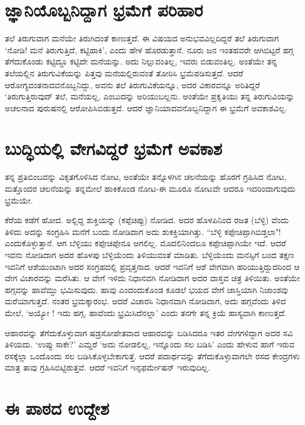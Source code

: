 \section*{ಜ್ಞಾನಿಯೊಬ್ಬನಿದ್ದಾಗ ಭ್ರಮೆಗೆ ಪರಿಹಾರ}

ತಲೆ ತಿರುಗುವಾಗ ಮನೆಯೇ ತಿರುಗಿದಂತೆ ಕಾಣುತ್ತದೆ. ಈ ವಿಷಯದ ಅನುಭವವಿಲ್ಲದಿದ್ದರೆ ತಲೆ ತಿರುಗುವಾಗ `ನೋಡಿ! ಮನೆ ತಿರುಗುತ್ತಿದೆ, ಕಟ್ಟಿಹಾಕಿ', ಎಂದು ಹೇಳ ಹೊರಡುತ್ತಾನೆ. ನೂರು ಜನ ಇಂತಹವರೇ ಆಗಿಬಿಟ್ಟರೆ ಹಗ್ಗ ತೆಗೆದುಕೊಂಡು ಕಟ್ಟಿದ್ದೂ ಕಟ್ಟಿದೇ ಮನೆಯನ್ನು. ಅದು ನಿಲ್ಲುವಂತಿಲ್ಲ, ಇವರು ಬಿಡುವಂತಿಲ್ಲ. ಅಂತೆಯೇ ತನ್ನ ತಲೆಯಲ್ಲಿನ ತಿರುಗುವಿಕೆಯನ್ನು ಪಿತ್ತವು ಮನೆಯಲ್ಲಿರುವಂತೆ ತೋರಿಸಿ ಭ್ರಮೆಪಡಿಸುತ್ತದೆ. ಆದರೆ ಆರೋಗ್ಯವಂತನಾದವನೊಬ್ಬನಿದ್ದು, ಅವನು ತಲೆ ತಿರುಗುವಿಕೆಯನ್ನೂ, ಅದರ ವಿಕಾರವನ್ನೂ ಅರಿತಿದ್ದರೆ `ತಿರುಗುತ್ತಿರುವುದ್ ತಲೆ, ಮನೆಯಲ್ಲ, ಎಂಬುದನ್ನು ಅರಿಯುಬಲ್ಲನು. ಅಂತೆಯೇ ಪ್ರಕೃತಿಯು ತನ್ನ ತಿರುಗುವಿಯನ್ನು ಅಚಲನಾದ ಪುರುಷನಲ್ಲಿ ಆರೋಪಿಸಿಬಿಡುತ್ತದೆ. ಆದರೆ ಜ್ಞಾನಿಯಾದವನೊಬ್ಬನಿದ್ದಾಗ ಈ ಭ್ರಮೆಗೆ ಅವಕಾಶವಿಲ್ಲ.

\section*{ಬುದ್ಧಿಯಲ್ಲಿ ವೇಗವಿದ್ದರೆ ಭ್ರಮೆಗೆ ಅವಕಾಶ}
ತನ್ನ ಪ್ರತಿಬಿಂಬವನ್ನು ವಿಕೃತಗೊಳಿಸಿದ ನೋಟ, ಅಂತೆಯೇ ತನ್ನೊಳಗಿನ ಚಲನೆಯನ್ನು ಹೊರಗೆ ಗ್ರಹಿಸಿದ ನೋಟ, ಮತ್ತೊಂದರ ಚಲನೆಯನ್ನು  ತನ್ನಮೇಲೆ ಹಾಕಿಕೊಂಡ ನೋಟ-ಈ ಮೂರೂ ನೋಟವೇ ಆದರೂ ಇದರಿಂದಾಗುವುದು ಭ್ರಮೆಯೇ.

ಕೆರೆಯ ಕಡೆಗೆ ಹೋದ. ಅಲ್ಲಿದ್ದ ಶುಕ್ತಿಯನ್ನು (ಕಪ್ಪೆಚಿಪ್ಪು) ನೋಡಿದ. ಅದರ ಹೊಳಪಿನಿಂದ ರಜತ (ಬೆಳ್ಳಿ) ವೆಂದು ತಿಳಿದು ಅದನ್ನು ಸಂಗ್ರಹಿಸಿ ಮನೆಗೆ ಬಂದು ನೋಡಿದಾಗ ಅದು ಶುಕಕ್ತಿಯಾಗಿತ್ತು. ``ಬೆಳ್ಳಿ ಕಪ್ಪೇಚಿಪ್ಪಾಗಿಬಿಡ್ತಲಾ"! ಎಂದುಕೊಳ್ಳುತ್ತಾನೆ. ಆಗ ಬೆಳ್ಳಿಯು ಕಪ್ಪೇಚಿಪ್ಪೇನೂ ಆಗಲಿಲ್ಲ. ಮೊದಲಿನಿಂದಲೂ ಕಪ್ಪೇಚಿಪ್ಪಾಗಿಯೇ ಇದೆ. ಆದರೆ ಇವನು ನೋಡಿದಾಗ ಅದರ ಹೊಳಪು ಬೆಳ್ಳಿಯೆಂದು ತಿಳಿಯುವಂತೆ ಮಾಡಿತು. ಬೆಳ್ಳಿಯೆಂದು ಮನಸ್ಸಿಗೆ ಬಂದ ತಕ್ಷಣ ಇವನಿಗೆ ಆಶೆಯುಂಟಾಗಿ ಅದರ ಸಂಗ್ರಹದಲ್ಲಿ ಪ್ರವೃತ್ತನಾದ. ಆದರೆ ಇವನಿಗೆ ಆಶೆ ವೇಗವಾಗಿ ಹರಿಯುತ್ತಿದ್ದುದರಿಂದ ಆ ವೇಗ ವಿಚಾರವನ್ನು ಮರೆಸಿತು. ಆ ವೇಗೆ ಇಳಿದು ನಿಧಾನವಗಿ ನೋಡಿದಾಗ ಅದರ ವಾಸ್ತವ ಚಿತ್ರ ತಿಳಿಯಿತು. ಅಂತೆಯೇ ಹಗ್ಗವನ್ನು ಹಾವೆಮ್ದು  ಭಮಿಸುವುದು. ಹಾವು ಎಂದಂದುಕೊಂಡ ಕೂಡಲೆ ಭಯದ ವೇಗೆ ಜಾಸ್ತಿಯಾಗಿ ನಿಜಾಂಶವು ಮರೆಯಾಗುತ್ತದೆ. ನಂತರ ಭ್ರಮಕ್ಕಾರಂಭ. ಆದರೆ ವಿಚಾರಸಿ ನಿಧಾನವಾಗಿ ನೋಡಿದಾಗ, ಅದು ಹಗ್ಗವೆಂದು ತಿಳಿದ ಮೇಲೆ, `ಅಯ್ಯೋ ! ಇದು ಹಗ್ಗ, ಹಾವೆಂದು ಭ್ರಮಿಸಿದೆನಲ್ಲಾ' ಎಂದು ತನಗೇ ತನ್ನ ಕ್ರಿಯೆ ಹಾಸ್ಯವಾಗಿ ಕಾಣುತ್ತದೆ.

ಆಹಾರವನ್ನು ತೆಗೆದುಕೊಳ್ಳುವಾಗ ಷಡ್ರಸೋಪೇತವಾದ ಆಹಾರವನ್ನು ಬಡಿಸಿದರೂ ಇತರ ವೇಗಗಳಿದ್ದಾಗ ಅದರ ಸವಿ ತಿಳಿಯದು. `ಉಪ್ಪು ಸಾಕೇ?' ಎಮ್ದರೆ `ಅದು ನೋಡಲಿಲ್ಲ, ಇನ್ನೊಂದು ಸಲ ಬಡಿಸಿ' ಎಂದು ಹೇಳುವ ಹಾಗೆ ಇರುವ ರಸಕ್ಕೆಲ್ಲಾ ಒಂದೊಂದು ಸಲ ಬಡಿಸಿಕೊಳ್ಳಬೇಕಾಗುತ್ತೆ. ಆದರೆ ಪದಾರ್ಥವನ್ನು ತೆಗೆದುಕೊಳ್ಳುವಾಗಲೇ ರಸದ ಕೇಂದ್ರಗಳು ಮಾತ್ರ ತಾವು ಗ್ರಹಿಸಿಬಿಟ್ಟಿರುತ್ತವೆ. ಆದರೆ ಇವನಿಗೆ ಇನ್ಫಫರ್ಮೇಷನ್ ಇರುವುದಿಲ್ಲ.

\section*{ಈ ಪಾಠದ ಉದ್ದೇಶ}

